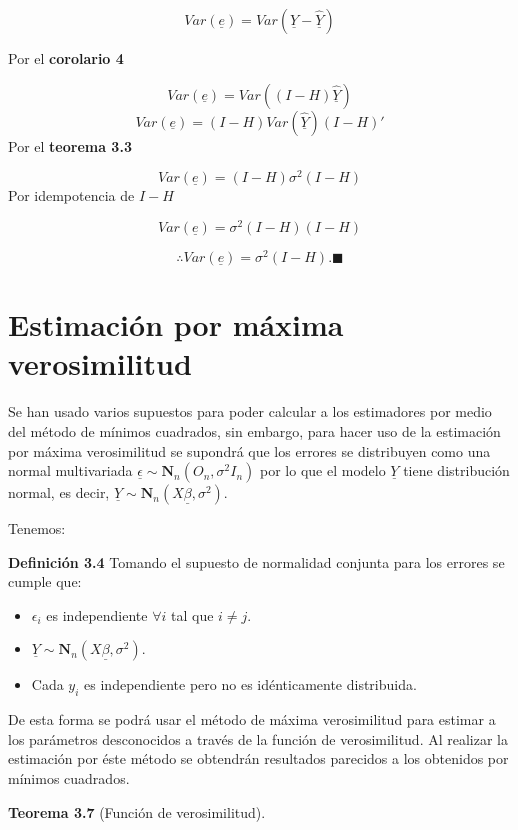 \documentclass[
  a4paper,
  oneside,
  openany]{book}
\begin{document}
\[Var(\underline{e})=Var\left( \underline{Y}-\underline{\hat{Y}}\right)\]

Por el \textbf{corolario 4}

\[Var(\underline{e})=Var\left( (I-H)\underline{\hat{Y}}\right)\]
\[Var(\underline{e})=(I-H)Var(\underline{\hat{Y}})(I-H)'\]
Por el \textbf{teorema 3.3}

\[Var(\underline{e})=(I-H)\sigma^2(I-H)\]
Por idempotencia de \(I-H\)

\[Var(\underline{e})=\sigma^2(I-H)(I-H)\]

\[\therefore Var(\underline{e})=\sigma^2(I-H). \blacksquare\]

\hypertarget{estimaciuxf3n-por-muxe1xima-verosimilitud}{%
\section{Estimación por máxima verosimilitud}\label{estimaciuxf3n-por-muxe1xima-verosimilitud}}

Se han usado varios supuestos para poder calcular a los estimadores por medio del método de mínimos cuadrados, sin embargo, para hacer uso de la estimación por máxima verosimilitud se supondrá que los errores se distribuyen como una normal multivariada \(\underline{\epsilon} \sim \mathbf{N}_{n}(O_{n},\sigma^2 I_{n})\) por lo que el modelo \(\underline{Y}\) tiene distribución normal, es decir, \(\underline{Y} \sim \mathbf{N}_n (X\underline{\beta},\sigma^2).\)

Tenemos:

\textbf{Definición 3.4} Tomando el supuesto de normalidad conjunta para los errores se cumple que:

\begin{itemize}
\item
  \(\epsilon_{i}\) es independiente \(\forall i\) tal que \(i \neq j.\)
\item
  \(\underline{Y}\sim \mathbf{N}_{n}(X\underline{\beta},\sigma^2).\)
\item
  Cada \(y_{i}\) es independiente pero no es idénticamente distribuida.
\end{itemize}

De esta forma se podrá usar el método de máxima verosimilitud para estimar a los parámetros desconocidos a través de la función de verosimilitud. Al realizar la estimación por éste método se obtendrán resultados parecidos a los obtenidos por mínimos cuadrados.

\textbf{Teorema 3.7} (Función de verosimilitud).
\end{document}
